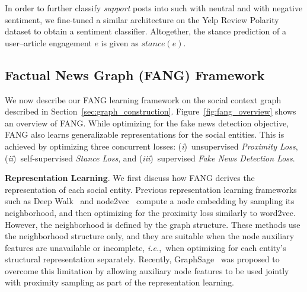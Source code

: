 \documentclass[sigconf]{acmart}
\theoremstyle{definition}
\theoremstyle{hypothesis}
\begin{document}
In order to further classify \textit{support} posts into such with neutral and with negative sentiment, we fine-tuned a similar architecture on the Yelp Review Polarity dataset to obtain a sentiment classifier. Altogether, the stance prediction of a user--article engagement $e$ is given as $stance(e)$.

\subsection{Factual News Graph (FANG) Framework}\label{sec:fang}

We now describe our FANG learning framework on the social context graph described in Section~\ref{sec:graph_construction}. Figure~\ref{fig:fang_overview} shows an overview of FANG.
While optimizing for the fake news detection objective, FANG also learns generalizable representations for the social entities. This is achieved by optimizing three concurrent losses: (\emph{i})~unsupervised \textit{Proximity Loss}, (\emph{ii})~self-supervised \textit{Stance Loss}, and (\emph{iii})~supervised \textit{Fake News Detection Loss}.

\textbf{Representation Learning}. We first discuss how FANG derives the representation of each social entity. Previous representation learning frameworks such as Deep Walk~\cite{perozzi2014deepwalk} and node2vec~\cite{grover2016node2vec} compute a node embedding by sampling its neighborhood, and then optimizing for the proximity loss similarly to word2vec. However, the neighborhood is defined by the graph structure. These methods use the neighborhood structure only, and they are suitable when the node auxiliary features are unavailable or incomplete, \emph{i.e.},~when optimizing for each entity's structural representation separately. Recently, GraphSage~\cite{Hamilton2017InductiveRL} was proposed to overcome this limitation by allowing auxiliary node features to be used jointly with proximity sampling as part of the representation learning. 
\end{document}
